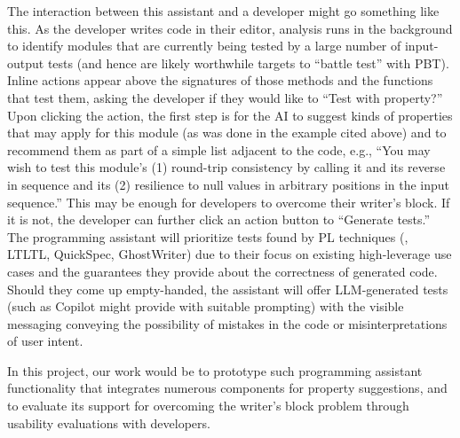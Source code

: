 The interaction between this assistant and a developer might go
something like this. As the
developer writes code in their editor, analysis runs in the background to
identify modules that are currently being tested by a large number of
input-output tests (and hence are likely worthwhile targets to ``battle test''
with PBT). Inline actions appear
above the signatures of those methods and the
functions that test them, asking the developer if they would like to ``Test with
property?'' Upon clicking the action, the first step is for the AI to suggest
kinds of properties that may apply for this module (as was done in the example
cited above) and to recommend them as part of a simple list adjacent to the
code, e.g., ``You may wish to test this module's (1) round-trip consistency by
calling it and its reverse in sequence and its (2) resilience to null values in
arbitrary positions in the input sequence.'' This may be enough for developers
to overcome their writer's block. If it is not, the developer can further click
an action button to ``Generate tests.'' The programming assistant will
prioritize tests found by PL techniques ({\Mica}, LTLTL, QuickSpec, GhostWriter)
due to their focus on existing high-leverage use cases and the guarantees they
provide about the correctness of generated code. Should they come up
empty-handed, the assistant will offer LLM-generated tests (such as
Copilot might
provide with suitable prompting) with the visible messaging conveying the
possibility of mistakes in the code or misinterpretations of user intent.

In this project, our work would be to prototype such programming assistant
functionality that integrates numerous components for property suggestions,
and to evaluate its support for overcoming the writer's block problem through
usability evaluations with developers.


